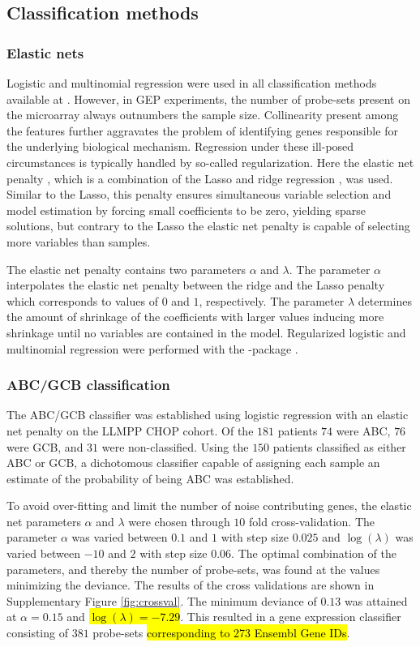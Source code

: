\documentclass{article}
\begin{document}
\subsection{Classification methods}

\subsubsection{Elastic nets}
Logistic and multinomial regression were used in all classification methods available at \hemaClass{}.
However, in GEP experiments, the number of probe-sets present on the microarray always outnumbers the sample size.
Collinearity present among the features further aggravates the problem of identifying genes responsible for the underlying biological mechanism.
Regression under these ill-posed circumstances is typically handled by so-called regularization.
Here the elastic net penalty \citep{Friedman2010, Zou2005}, which is a combination of the Lasso \citep{Tibshirani1996} and ridge regression \citep{Hoerl1970}, was used.
Similar to the Lasso, this penalty ensures simultaneous variable selection and model estimation by forcing small coefficients to be zero, yielding sparse solutions,
but contrary to the Lasso the elastic net penalty is capable of selecting more variables than samples.

The elastic net penalty contains two parameters $\alpha$ and $\lambda$.
The parameter $\alpha$ interpolates the elastic net penalty between the ridge and the Lasso penalty which corresponds to values of $0$ and $1$, respectively.
The parameter $\lambda$ determines the amount of shrinkage of the coefficients with larger values inducing more shrinkage until no variables are contained in the model.
Regularized logistic and multinomial regression were performed with the \R{}-package  \citep{Friedman2010}.

\subsubsection{ABC/GCB classification}
The ABC/GCB classifier was established using logistic regression with an elastic net penalty on the LLMPP CHOP cohort.
Of the $181$ patients $74$ were ABC, $76$ were GCB, and $31$ were non-classified.
Using the $150$ patients classified as either ABC or GCB, a dichotomous classifier capable of assigning each sample an estimate of the probability of being ABC was established.

To avoid over-fitting and limit the number of noise contributing genes, the elastic net parameters $\alpha$ and $\lambda$ were chosen through $10$ fold cross-validation.
The parameter $\alpha$ was varied between $0.1$ and $1$ with step size $0.025$ and $\log(\lambda)$ was varied between $-10$ and $2$ with step size $0.06$.
The optimal combination of the parameters, and thereby the number of probe-sets, was found at the values minimizing the deviance.
The results of the cross validations are shown in Supplementary Figure \ref{fig:crossval}.
The minimum deviance of $0.13$ was attained at $\alpha = 0.15$ and \hl{$\log(\lambda) = -7.29$}. This resulted in a gene expression classifier consisting of $381$ probe-sets \hl{corresponding to 273 Ensembl Gene IDs}.
\end{document}
